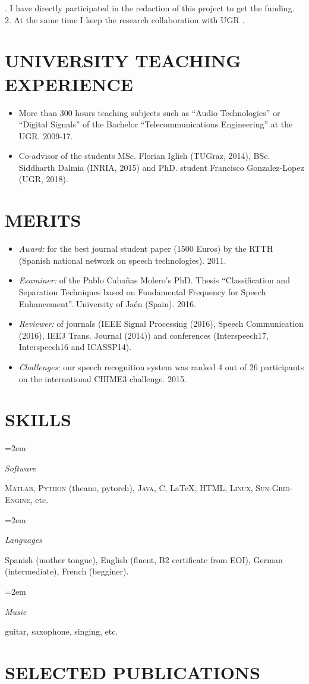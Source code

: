 \documentclass[paper=a4,fontsize=11pt]{scrartcl} %
\newlength{\spacebox}
\newcommand{\NewPart}[1]{\section*{\uppercase{#1}}}
\newcommand{\PersonalEntry}[2]{
        \noindent\hangindent=2em\hangafter=0 %
        \parbox{\spacebox}{        %
        \textit{#1}}               %
        \hspace{1.5em} #2 \par}    %
\newcommand{\SkillsEntry}[2]{      %
        \noindent\hangindent=2em\hangafter=0 %
        \parbox{\spacebox}{        %
        \textit{#1}}               %
        \hspace{1.5em} #2 \par}    %
\begin{document}
{\footnotesize {}. I have directly participated in the redaction of this project to get the funding.
\\ 2. At the same time I keep the research collaboration with UGR .}

\NewPart{University teaching experience}{}
\begin{itemize}
 \item More than 300 hours teaching subjects such as ``Audio Technologies'' or ``Digital Signals'' of the Bachelor ``Telecommunications Engineering'' at the UGR. 2009-17.
 \item Co-advisor of the students MSc. Florian Iglish (TUGraz, 2014), BSc. Siddharth Dalmia (INRIA, 2015)  and PhD. student Francisco Gonzalez-Lopez  (UGR, 2018).
\end{itemize}


\NewPart{Merits}{}

\begin{itemize}
 \item \textit{Award:} for the best journal student paper  (1500 Euros) by the RTTH (Spanish national network on speech technologies). 2011.
 \item \textit{Examiner:} of the Pablo Caba{\~n}as Molero's PhD. Thesis ``Classification and Separation Techniques based on Fundamental Frequency for Speech Enhancement''. University of Ja\'en (Spain). 2016.
 \item \textit{Reviewer:} of journals (IEEE Signal Processing (2016), Speech Communication (2016), IEEJ Trans. Journal (2014)) and conferences (Interspeech17, Interspeech16 and ICASSP14).
 \item \textit{Challenges:} our speech recognition system  was ranked 4 out of 26 participants on the international CHIME3 challenge. 2015. 
\end{itemize}



\NewPart{Skills}{}

\SkillsEntry{Software}{\textsc{Matlab}, \textsc{Python} (theano, pytorch), \textsc{Java}, \textsc{C}, \LaTeX, \textsc{HTML}, \textsc{Linux}, \textsc{Sun-Grid-Engine}, etc. }
\SkillsEntry{Languages}{Spanish (mother tongue), English (fluent, B2 certificate from EOI), German (intermediate), French (begginer).}
\SkillsEntry{Music}{guitar, saxophone, singing, etc.}



\NewPart{Selected publications}{}


\end{document}
